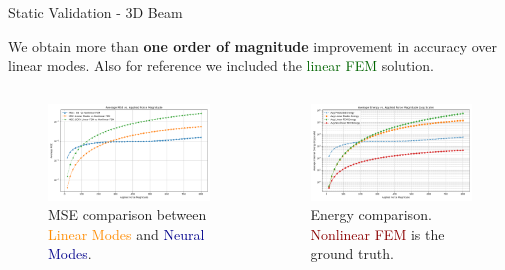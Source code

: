 \documentclass{beamer}
\begin{document}
\begin{frame}{Static Validation - 3D Beam}
    
    We obtain more than \textbf{one order of magnitude} improvement in accuracy over linear modes. Also for reference we included the \textcolor{darkgreen}{linear FEM} solution.
    \begin{columns}[T]
        \begin{column}{0.5\textwidth}
   
            \begin{figure}
                \includegraphics[width=\textwidth]{Images/beam_static_mse.png}
                \caption{MSE comparison between \textcolor{darkorange}{Linear Modes} and \textcolor{darkblue}{Neural Modes}.}
            \end{figure}
        \end{column}
        
        \begin{column}{0.5\textwidth}
            \begin{figure}
                \includegraphics[width=\textwidth]{Images/beam_static_energy.png}
                \caption{Energy comparison. \textcolor{darkred}{Nonlinear FEM} is the ground truth.}
            \end{figure}
        \end{column}
    \end{columns}
\end{frame}
\end{document}
